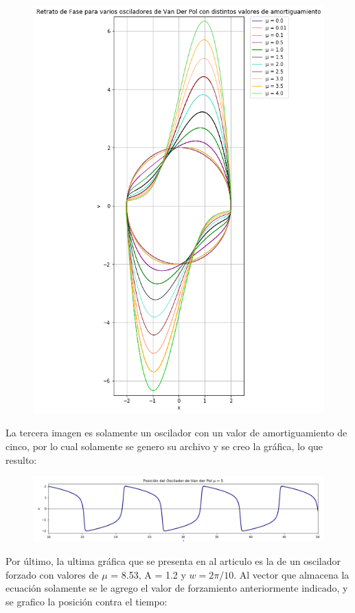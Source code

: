 \documentclass[12pt]{article}
\begin{document}
\pagebreak

\begin{figure}[h!]
    \centering
\includegraphics[width=4.5in]{Im2.png}
\end{figure}

La tercera imagen es solamente un oscilador con un valor de amortiguamiento de cinco, por lo cual solamente se genero su archivo y se creo la gráfica, lo que resulto: 

\begin{figure}[h!]
    \centering
\includegraphics[width=5in]{Im3.png}
\end{figure}

\pagebreak

Por último, la ultima gráfica que se presenta en al articulo es la de un oscilador forzado con valores de $\mu$ = 8.53, A = 1.2 y $w = 2\pi/ 10$. Al vector que almacena la ecuación solamente se le agrego el valor de forzamiento anteriormente indicado, y se grafico la posición contra el tiempo:
\end{document}
